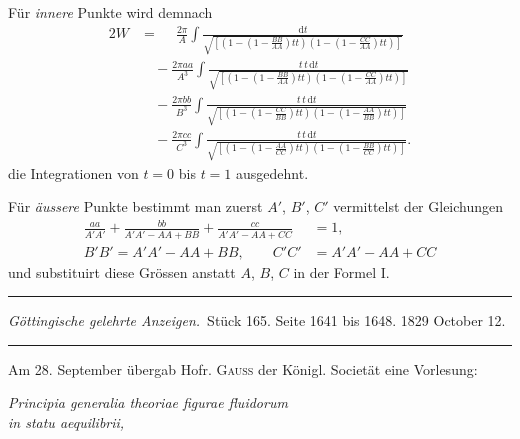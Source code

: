 \documentclass[11pt,a4paper]{article}
\begin{document}
Für \textit{innere} Punkte wird demnach
\begin{alignat*}{2}
W &= \phantom{-}\frac{2\pi}{A} \int \frac{\mathrm{d}t}{\sqrt{[(1 - (1 - \frac{BB}{AA})tt)(1 - (1 - \frac{CC}{AA})tt)]}} \\
  &\quad - \frac{2\pi aa}{A^3} \int \frac{t\,t\,\mathrm{d}t}{\sqrt{[(1 - (1 - \frac{BB}{AA})tt)(1 - (1 - \frac{CC}{AA})tt)]}} \\
  &\quad - \frac{2\pi bb}{B^3} \int \frac{t\,t\,\mathrm{d}t}{\sqrt{[(1 - (1 - \frac{CC}{BB})tt)(1 - (1 - \frac{AA}{BB})tt)]}} \\
  &\quad - \frac{2\pi cc}{C^3} \int \frac{t\,t\,\mathrm{d}t}{\sqrt{[(1 - (1 - \frac{AA}{CC})tt)(1 - (1 - \frac{BB}{CC})tt)]}}.
\end{alignat*}
die Integrationen von $t = 0$ bis $t = 1$ ausgedehnt.

Für \textit{äussere} Punkte bestimmt man zuerst $A'$, $B'$, $C'$ vermittelst der Gleichungen
\begin{align*}
\frac{aa}{A'A'} + \frac{bb}{A'A' - AA + BB} + \frac{cc}{A'A' - AA + CC} &= 1, \\
B'B' = A'A' - AA + BB, \qquad C'C' &= A'A' - AA + CC
\end{align*}
und substituirt diese Grössen anstatt $A$, $B$, $C$ in der Formel I.

\newpage
\begin{center}
\rule{0.8\textwidth}{0.4pt}

\smallskip
\textit{Göttingische gelehrte Anzeigen.}\ Stück 165. Seite 1641 bis 1648. 1829 October 12.
\smallskip
\rule{0.8\textwidth}{0.4pt}
\end{center}

\bigskip\noindent
Am 28. September übergab Hofr. \textsc{Gauss} der Königl. Societät eine Vorlesung:

\begin{center}
\textit{Principia generalia theoriae figurae fluidorum}\\
\textit{in statu aequilibrii,}
\end{center}
\end{document}
